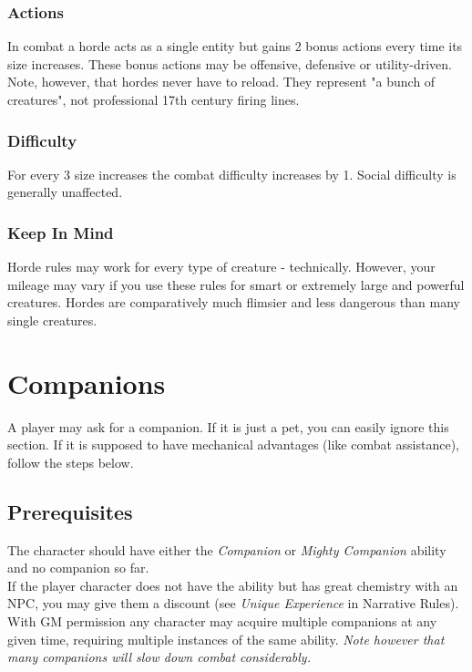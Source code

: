 \documentclass[12pt,a4paper,openany,usenames,dvipsnames]{book}
\begin{document}
	\subsection*{Actions}
	In combat a horde acts as a single entity but gains 2 bonus actions every time its size increases. These bonus actions may be offensive, defensive or utility-driven. \\
	Note, however, that hordes never have to reload. They represent "a bunch of creatures", not professional 17th century firing lines.
	
	\subsection*{Difficulty}
	For every 3 size increases the combat difficulty increases by 1. Social difficulty is generally unaffected.
	
	\begin{exampleblock}
	\subsection*{Keep In Mind}
		Horde rules may work for every type of creature - technically.
		However, your mileage may vary
		if you use these rules for smart or extremely large and powerful creatures.
		Hordes are comparatively much flimsier and less dangerous than many single creatures.
	\end{exampleblock}
	
	
	\chapter{Companions}
	A player may ask for a companion. If it is just a pet, you can easily ignore this section. If it is supposed to have mechanical advantages (like combat assistance), follow the steps below.
	\section{Prerequisites}
	The character should have either the \textit{Companion} or \textit{Mighty Companion} ability and no companion so far.\\
	If the player character does not have the ability but has great chemistry with an NPC, you may give them a discount (see \textit{Unique Experience} in Narrative Rules).\\
	With GM permission any character may acquire multiple companions at any given time,
		requiring multiple instances of the same ability.
	\textit{Note however that many companions will slow down combat considerably.}
\end{document}
